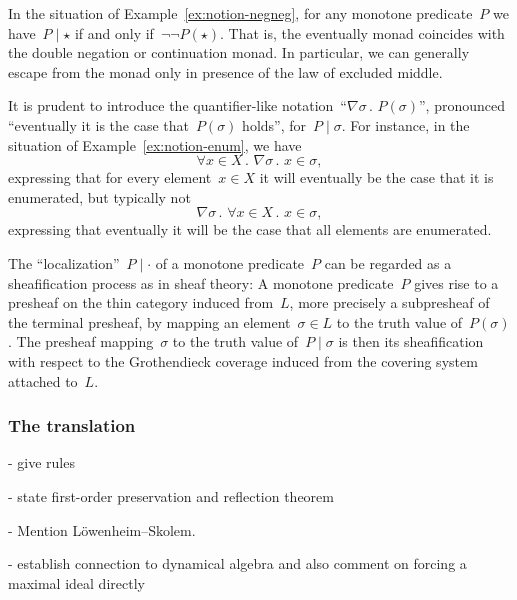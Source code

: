 \documentclass[envcountsect,envcountsame,runningheads]{llncs}
\renewcommand{\_}{\mathpunct{.}\,}
\begin{document}
\begin{example}In the situation of Example~\ref{ex:notion-negneg}, for any
monotone predicate~$P$ we have~$P \mid \star$ if and only if~$\neg\neg
P(\star)$. That is, the eventually monad coincides with the double negation or
continuation monad. In particular, we can generally escape from the monad only
in presence of the law of excluded middle.\end{example}

It is prudent to introduce the quantifier-like notation~``$\nabla \sigma\_
P(\sigma)$'', pronounced ``eventually it is the case that~$P(\sigma)$ holds'',
for~$P \mid \sigma$. For instance, in the situation of
Example~\ref{ex:notion-enum}, we have
\[ \forall x \in X\_ \nabla \sigma\_ x \in \sigma, \]
expressing that for every element~$x \in X$ it will eventually be the case that
it is enumerated, but typically not
\[ \nabla \sigma\_ \forall x \in X\_ x \in \sigma, \]
expressing that eventually it will be the case that all elements are
enumerated.

\begin{remark}The ``localization''~$P \mid \cdot$ of a monotone predicate~$P$
can be regarded as a sheafification process as in sheaf theory: A monotone
predicate~$P$ gives rise to a presheaf on the thin category induced from~$L$,
more precisely a subpresheaf of the terminal presheaf, by mapping an
element~$\sigma \in L$ to the truth value of~$P(\sigma)$. The presheaf
mapping~$\sigma$ to the truth value of~$P \mid \sigma$ is then its
sheafification with respect to the Grothendieck coverage induced from the
covering system attached to~$L$.\end{remark}







\subsubsection{The translation}

- give rules

- state first-order preservation and reflection theorem

- Mention
  Löwenheim--Skolem.

- establish connection to dynamical algebra and also comment on
  forcing a maximal ideal directly
\end{document}
